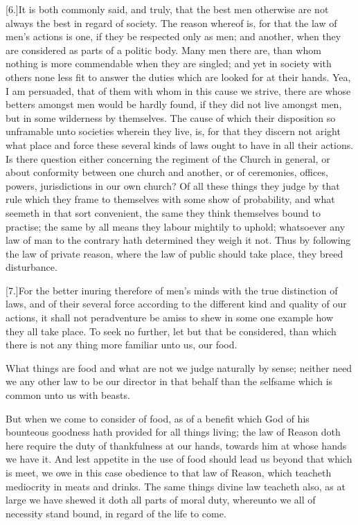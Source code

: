 [6.]It is both commonly said, and truly, that the best men otherwise are not always the best in regard of society. The reason whereof is, for that the law of men’s actions is one, if they be respected only as men; and another, when they are considered as parts of a politic body. Many men there are, than whom nothing is more commendable when they are singled; and yet in society with others none less fit to answer the duties which are looked for at their hands. Yea, I am persuaded, that of them with whom in this cause we strive, there are whose betters amongst men would be hardly found, if they did not live amongst men, but in some wilderness by themselves. The cause of which their disposition so unframable unto societies wherein they live, is, for that they discern not aright what place and force these several kinds of laws ought to have in all their actions. Is there question either concerning the regiment of the Church in general, or about conformity between one church and another, or of ceremonies, offices, powers, jurisdictions in our own church? Of all these things they judge by that rule which they frame to themselves with some show of probability, and what seemeth in that sort convenient, the same they think themselves bound to practise; the same by all means they labour mightily to uphold; whatsoever any law of man to the contrary hath determined they weigh it not. Thus by following the law of private reason, where the law of public should take place, they breed disturbance.

[7.]For the better inuring therefore of men’s minds with  the true distinction of laws, and of their several force according to the different kind and quality of our actions, it shall not peradventure be amiss to shew in some one example how they all take place. To seek no further, let but that be considered, than which there is not any thing more familiar unto us, our food.

What things are food and what are not we judge naturally by sense; neither need we any other law to be our director in that behalf than the selfsame which is common unto us with beasts.

But when we come to consider of food, as of a benefit which God of his bounteous goodness hath provided for all things living; the law of Reason doth here require the duty of thankfulness at our hands, towards him at whose hands we have it. And lest appetite in the use of food should lead us beyond that which is meet, we owe in this case obedience to that law of Reason, which teacheth mediocrity in meats and drinks. The same things divine law teacheth also, as at large we have shewed it doth all parts of moral duty, whereunto we all of necessity stand bound, in regard of the life to come.


